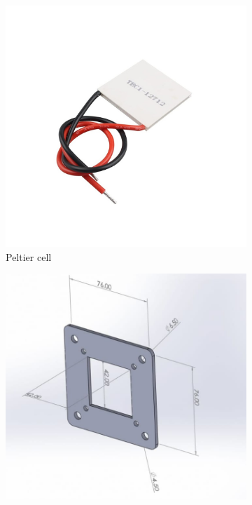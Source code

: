 \documentclass{article}
\begin{document}
\begin{figure}[htp]
    \begin{subfigure}[b]{0.3\textwidth}
    \centering
    \includegraphics[width=\textwidth]{Images/peltier.jpg}
    \caption{Peltier cell}
    \end{subfigure}
    \hfill
    \begin{subfigure}[b]{0.3\textwidth}
        \centering
        \includegraphics[width=\textwidth]{Images/Peltierbase2.jpeg}

\end{subfigure}
\end{figure}
\end{document}
